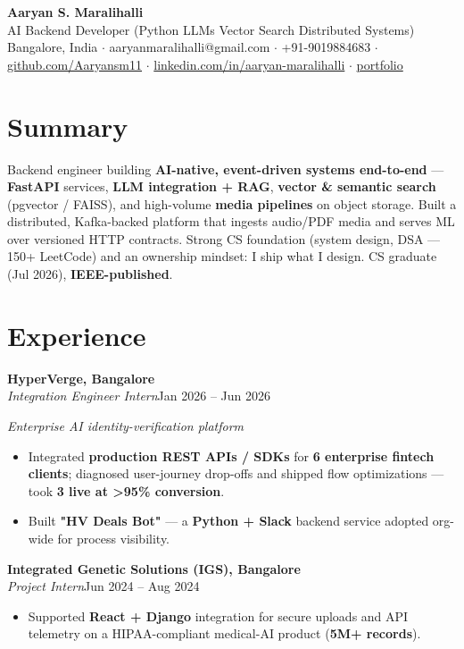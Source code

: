\documentclass[10pt,a4paper]{article}
\begin{document}
\vspace*{-1cm}
\begin{center}
{\LARGE\bfseries Aaryan S. Maralihalli}\\[0.5em]
{\large AI Backend Developer (Python  \textbar{}  LLMs  \textbar{}  Vector Search  \textbar{}  Distributed Systems)}\\[0.3em]
Bangalore, India $\cdot$ aaryanmaralihalli@gmail.com $\cdot$ +91-9019884683 $\cdot$ \href{https://github.com/Aaryansm11}{github.com/Aaryansm11} $\cdot$ \href{https://linkedin.com/in/aaryan-maralihalli}{linkedin.com/in/aaryan-maralihalli} $\cdot$ \href{https://portfolio-zeta-ten-85.vercel.app}{portfolio}
\end{center}\vspace{0.4ex}
\section*{Summary}
Backend engineer building \textbf{AI-native, event-driven systems end-to-end} --- \textbf{FastAPI} services, \textbf{LLM integration + RAG}, \textbf{vector \& semantic search} (pgvector / FAISS), and high-volume \textbf{media pipelines} on object storage. Built a distributed, Kafka-backed platform that ingests audio/PDF media and serves ML over versioned HTTP contracts. Strong CS foundation (system design, DSA --- 150+ LeetCode) and an ownership mindset: I ship what I design. CS graduate (Jul 2026), \textbf{IEEE-published}.\par\vspace{2pt}
\section*{Experience}
\vspace{1pt}\textbf{HyperVerge, Bangalore}\\
\textit{Integration Engineer Intern}\hfill Jan 2026 -- Jun 2026\par\vspace{1pt}
{\small\itshape Enterprise AI identity-verification platform}\par\vspace{1pt}
\begin{itemize}
\item Integrated \textbf{production REST APIs / SDKs} for \textbf{6 enterprise fintech clients}; diagnosed user-journey drop-offs and shipped flow optimizations --- took \textbf{3 live at \textgreater{}95\% conversion}.
\item Built \textbf{"HV Deals Bot"} --- a \textbf{Python + Slack} backend service adopted org-wide for process visibility.
\end{itemize}
\vspace{1pt}\textbf{Integrated Genetic Solutions (IGS), Bangalore}\\
\textit{Project Intern}\hfill Jun 2024 -- Aug 2024\par\vspace{1pt}
\begin{itemize}
\item Supported \textbf{React + Django} integration for secure uploads and API telemetry on a HIPAA-compliant medical-AI product (\textbf{5M+ records}).
\end{itemize}
\end{document}

